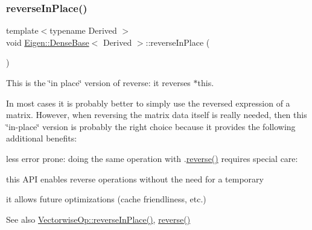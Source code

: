 \subsubsection{\texorpdfstring{reverseInPlace()}{reverseInPlace()}}
{\footnotesize\ttfamily template$<$typename Derived $>$ \\
void \mbox{\hyperlink{class_eigen_1_1_dense_base}{Eigen\+::\+Dense\+Base}}$<$ Derived $>$\+::reverse\+In\+Place (\begin{DoxyParamCaption}{ }\end{DoxyParamCaption})\hspace{0.3cm}{\ttfamily [inline]}}

This is the \char`\"{}in place\char`\"{} version of reverse\+: it reverses {\ttfamily $\ast$this}.

In most cases it is probably better to simply use the reversed expression of a matrix. However, when reversing the matrix data itself is really needed, then this \char`\"{}in-\/place\char`\"{} version is probably the right choice because it provides the following additional benefits\+:
\begin{DoxyItemize}
\item less error prone\+: doing the same operation with .\mbox{\hyperlink{class_eigen_1_1_dense_base_a38ea394036d8b096abf322469c80198f}{reverse()}} requires special care\+: 
\begin{DoxyCode}{0}
\end{DoxyCode}

\item this A\+PI enables reverse operations without the need for a temporary
\item it allows future optimizations (cache friendliness, etc.)
\end{DoxyItemize}

\begin{DoxySeeAlso}{See also}
\mbox{\hyperlink{class_eigen_1_1_vectorwise_op_ab9dd7c273eb2ba8defaab2d55156936b}{Vectorwise\+Op\+::reverse\+In\+Place()}}, \mbox{\hyperlink{class_eigen_1_1_dense_base_a38ea394036d8b096abf322469c80198f}{reverse()}} 
\end{DoxySeeAlso}
\mbox{\label{class_eigen_1_1_dense_base_a5b0fa44c191d40a2f82260f7e5cdeaa9}} 
